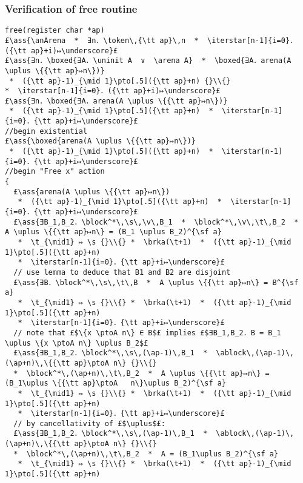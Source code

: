 \documentclass[12pt,a4paper]{article}
\makeatletter
\newcommand{\ml}[2][t]{\mbox{\mdseries\begin{tabular}[#1]{@{}L@{}}#2\end{tabular}}}
\newcommand{\ass}[1]{\ensuremath{{\color{blue}\left\{\ml[c]{#1}\right\}}}}
\newcommand{\iterstar}[2][]{\text{\LARGE $*$}^{#1}_{#2}}
\newcommand{\arena}{\mathop{\emph{arena}}}
\newcommand{\anArena}{\emph{anArena}}
\newcommand{\token}{\mathop{\emph{token}}}
\newcommand{\block}{\mathop{\emph{block}}}
\newcommand{\ablock}{\mathop{\emph{ablock}}}
\newcommand{\s}{{\tt s}}
\renewcommand{\t}{{\tt t}}
\renewcommand{\v}{{\tt v}}
\newcommand{\brka}{\mathop{\emph{brka}}}
\newcommand{\ap}{{\tt ap}}
\newcommand{\ptoA}{\mathbin{↦_{\sf a}}}
\newcommand{\uninit}{\mathop{\emph{uninit}}}
\makeatother
\begin{document}
\subsubsection*{Verification of free routine}

\begin{lstlisting}
free(register char *ap) 
£\ass{\anArena  *  ∃n．\token\,{\tt ap}\,n  *  \iterstar[n-1]{i=0}．({\tt ap}+i)↦\underscore}£
£\ass{∃n．\boxed{∃A．\uninit A  ∨  \arena A}  *  \boxed{∃A．arena(A \uplus \{{\tt ap}↦n\})} 
 *  ({\tt ap}-1)_{\mid 1}\pto[.5]({\tt ap}+n) {}\\{}
*  \iterstar[n-1]{i=0}．({\tt ap}+i)↦\underscore}£
£\ass{∃n．\boxed{∃A．arena(A \uplus \{{\tt ap}↦n\})} 
 *  ({\tt ap}-1)_{\mid 1}\pto[.5]({\tt ap}+n)  *  \iterstar[n-1]{i=0}．{\tt ap}+i↦\underscore}£
//begin existential
£\ass{\boxed{arena(A \uplus \{{\tt ap}↦n\})} 
 *  ({\tt ap}-1)_{\mid 1}\pto[.5]({\tt ap}+n)  *  \iterstar[n-1]{i=0}．{\tt ap}+i↦\underscore}£
//begin "Free x" action
{
  £\ass{arena(A \uplus \{{\tt ap}↦n\}) 
   *  ({\tt ap}-1)_{\mid 1}\pto[.5]({\tt ap}+n)  *  \iterstar[n-1]{i=0}．{\tt ap}+i↦\underscore}£
  £\ass{∃B_1,B_2．\block^*\,\s\,\v\,B_1  *  \block^*\,\v\,\t\,B_2  *  A \uplus \{{\tt ap}↦n\} = (B_1 \uplus B_2)^{\sf a} 
   *  \t_{\mid1} ↦ \s {}\\{} *  \brka(\t+1)  *  ({\tt ap}-1)_{\mid 1}\pto[.5]({\tt ap}+n) 
   *  \iterstar[n-1]{i=0}．{\tt ap}+i↦\underscore}£
  // use lemma to deduce that B1 and B2 are disjoint
  £\ass{∃B．\block^*\,\s\,\t\,B  *  A \uplus \{{\tt ap}↦n\} = B^{\sf a} 
   *  \t_{\mid1} ↦ \s {}\\{} *  \brka(\t+1)  *  ({\tt ap}-1)_{\mid 1}\pto[.5]({\tt ap}+n) 
   *  \iterstar[n-1]{i=0}．{\tt ap}+i↦\underscore}£
  // note that £$\{x \ptoA n\} ∈ B$£ implies £$∃B_1,B_2．B = B_1 \uplus \{x \ptoA n\} \uplus B_2$£
  £\ass{∃B_1,B_2．\block^*\,\s\,(\ap-1)\,B_1  *  \ablock\,(\ap-1)\,(\ap+n)\,\{{\tt ap}\ptoA n\} {}\\{}
  *  \block^*\,(\ap+n)\,\t\,B_2  *  A \uplus \{{\tt ap}↦n\} = (B_1\uplus \{{\tt ap}\ptoA   n\}\uplus B_2)^{\sf a}
   *  \t_{\mid1} ↦ \s {}\\{} *  \brka(\t+1)  *  ({\tt ap}-1)_{\mid 1}\pto[.5]({\tt ap}+n) 
   *  \iterstar[n-1]{i=0}．{\tt ap}+i↦\underscore}£
  // by cancellativity of £$\uplus$£:
  £\ass{∃B_1,B_2．\block^*\,\s\,(\ap-1)\,B_1  *  \ablock\,(\ap-1)\,(\ap+n)\,\{{\tt ap}\ptoA n\} {}\\{}
  *  \block^*\,(\ap+n)\,\t\,B_2  *  A = (B_1\uplus B_2)^{\sf a}
   *  \t_{\mid1} ↦ \s {}\\{} *  \brka(\t+1)  *  ({\tt ap}-1)_{\mid 1}\pto[.5]({\tt ap}+n) 

\end{lstlisting}
\end{document}
